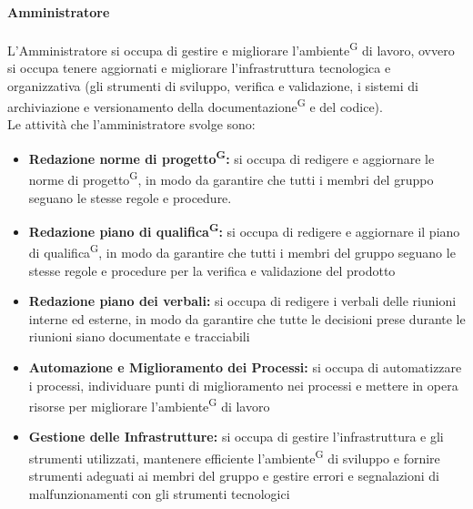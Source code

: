 \documentclass[a4paper, 11pt]{article}
\begin{document}
\paragraph{Amministratore}
L'Amministratore si occupa di gestire e migliorare l'ambiente\textsuperscript{G} di lavoro, ovvero si occupa tenere aggiornati e migliorare l'infrastruttura tecnologica e organizzativa 
(gli strumenti di sviluppo, verifica e validazione, i sistemi di archiviazione e versionamento della documentazione\textsuperscript{G} e del codice). \\
Le attività che l'amministratore svolge sono:
    \begin{itemize}
        \item \textbf{Redazione norme di progetto\textsuperscript{G}:} si occupa di redigere e aggiornare le norme di progetto\textsuperscript{G}, in modo da garantire che tutti i membri del gruppo seguano le stesse regole e procedure.
        \item \textbf{Redazione piano di qualifica\textsuperscript{G}:} si occupa di redigere e aggiornare il piano di qualifica\textsuperscript{G}, in modo da garantire che tutti i membri del gruppo seguano le stesse regole e procedure per la verifica e validazione del prodotto
        \item \textbf{Redazione piano dei verbali:} si occupa di redigere i verbali delle riunioni interne ed esterne, in modo da garantire che tutte le decisioni prese durante le riunioni siano documentate e tracciabili
        \item \textbf{Automazione e Miglioramento dei Processi:} si occupa di automatizzare i processi, individuare punti di miglioramento nei processi e mettere in opera risorse per migliorare l'ambiente\textsuperscript{G} di lavoro
        \item \textbf{Gestione delle Infrastrutture:} si occupa di gestire l'infrastruttura e gli strumenti utilizzati, mantenere efficiente l'ambiente\textsuperscript{G} di sviluppo e fornire strumenti adeguati ai membri del gruppo e gestire errori e segnalazioni di malfunzionamenti con gli strumenti tecnologici
    \end{itemize}
\end{document}
